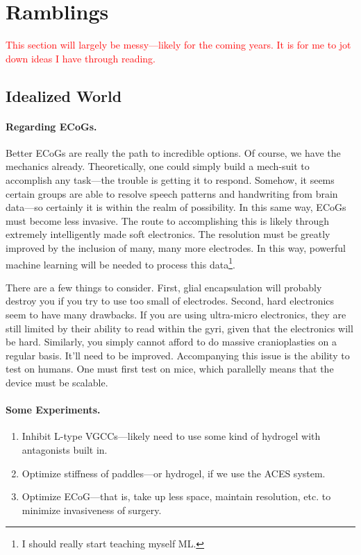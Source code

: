 \chapter{Ramblings}

{\large \textcolor{red}{This section will largely be messy---likely for the coming years. It is for me to jot down ideas I have through reading.}}\newline

\section{Idealized World}

\subsubsection{Regarding ECoGs.}
Better ECoGs are really the path to incredible options. Of course, we have the mechanics already. Theoretically, one could simply build a mech-suit to accomplish any task---the trouble is getting it to respond. Somehow, it seems certain groups are able to resolve speech patterns and handwriting from brain data---so certainly it is within the realm of possibility. In this same way, ECoGs must become less invasive. The route to accomplishing this is likely through extremely intelligently made soft electronics. The resolution must be greatly improved by the inclusion of many, many more electrodes. In this way, powerful machine learning will be needed to process this data\footnote{I should really start teaching myself ML.}.\newline

There are a few things to consider. First, glial encapsulation will probably destroy you if you try to use too small of electrodes. Second, hard electronics seem to have many drawbacks. If you are using ultra-micro electronics, they are still limited by their ability to read within the gyri, given that the electronics will be hard. Similarly, you simply cannot afford to do massive cranioplasties on a regular basis. It'll need to be improved. Accompanying this issue is the ability to test on humans. One must first test on mice, which parallelly means that the device must be scalable. 


\subsubsection{Some Experiments.}


\begin{enumerate}
    \item Inhibit L-type VGCCs---likely need to use some kind of hydrogel with antagonists built in. 
    \item Optimize stiffness of paddles---or hydrogel, if we use the ACES system. 
    \item Optimize ECoG---that is, take up less space, maintain resolution, etc. to minimize invasiveness of surgery. 
\end{enumerate}

